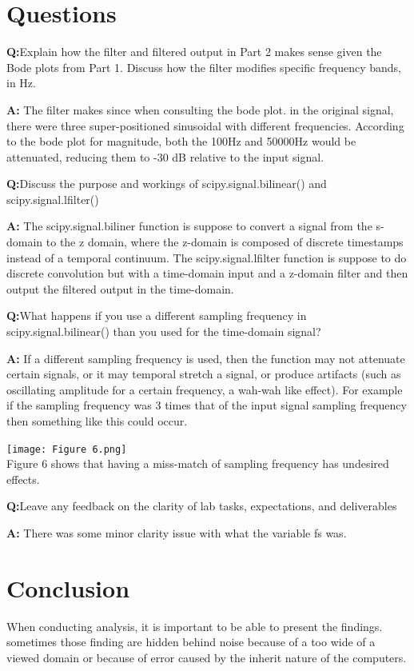\documentclass[12pt,a4paper]{article}
\newcommand{\Q}{\leavevmode\par\textbf {Q:}}
\newcommand{\A}{\par\textbf{A:} \normalfont}
\begin{document}
\section{Questions}\label{sec:res}

\Q Explain how the filter and filtered output in Part 2 makes sense given the Bode plots from Part 1. Discuss how the filter modifies specific frequency bands, in Hz.
\A  The filter makes since when consulting the bode plot. in the original signal, there were three super-positioned sinusoidal with different frequencies. According to the bode plot for magnitude, both the 100Hz and 50000Hz would be attenuated, reducing them to -30 dB relative to the input signal.

\Q Discuss the purpose and workings of scipy.signal.bilinear() and scipy.signal.lfilter()
\A The scipy.signal.biliner function is suppose to convert a signal from the s-domain to the z domain, where the z-domain is composed of discrete timestamps instead of a temporal continuum. The scipy.signal.lfilter function is suppose to do discrete convolution but with a time-domain input and a z-domain filter and then output the filtered output in the time-domain.

\Q What happens if you use a different sampling frequency in scipy.signal.bilinear() than you used for the time-domain signal?
\A If a different sampling frequency is used, then the function may not attenuate certain signals, or it may temporal stretch a signal, or produce artifacts (such as oscillating amplitude for a certain frequency, a wah-wah like effect). For example if the sampling frequency was 3 times that of the input signal sampling frequency then something like this could occur.


\texttt{[image: Figure 6.png]}\\
Figure 6 shows that having a miss-match of sampling frequency has undesired effects.

\Q Leave any feedback on the clarity of lab tasks, expectations, and deliverables
\A There was some minor clarity issue with what the variable fs was.



\section{Conclusion}\label{sec:res}
When conducting analysis, it is important to be able to present the findings.  sometimes those finding are hidden behind noise because of a too wide of a viewed domain or because of error caused by the inherit nature of the computers.





\end{document}
